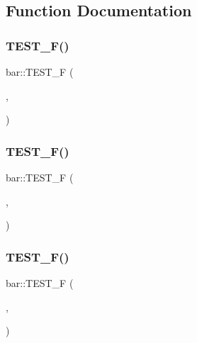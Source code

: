 \subsection{Function Documentation}
\mbox{\label{namespacebar_a95397ed83e5072747d6333cbfae5ea0e}} 
\subsubsection{\texorpdfstring{TEST\_F()}{TEST\_F()}\hspace{0.1cm}{\footnotesize\ttfamily [1/6]}}
{\footnotesize\ttfamily bar\+::\+T\+E\+S\+T\+\_\+F (\begin{DoxyParamCaption}\item[{\mbox{\hyperlink{classbar_1_1_mixed_up_test_suite_test}{Mixed\+Up\+Test\+Suite\+Test}}}]{,  }\item[{This\+Should\+Fail}]{ }\end{DoxyParamCaption})}

\mbox{\label{namespacebar_ae02a29b454cf88337a77336c2bf1f0a4}} 
\subsubsection{\texorpdfstring{TEST\_F()}{TEST\_F()}\hspace{0.1cm}{\footnotesize\ttfamily [2/6]}}
{\footnotesize\ttfamily bar\+::\+T\+E\+S\+T\+\_\+F (\begin{DoxyParamCaption}\item[{\mbox{\hyperlink{classbar_1_1_mixed_up_test_suite_test}{Mixed\+Up\+Test\+Suite\+Test}}}]{,  }\item[{This\+Should\+Fail\+Too}]{ }\end{DoxyParamCaption})}

\mbox{\label{namespacebar_a0e342ef00f400f593f866279689c55ac}} 
\subsubsection{\texorpdfstring{TEST\_F()}{TEST\_F()}\hspace{0.1cm}{\footnotesize\ttfamily [3/6]}}
{\footnotesize\ttfamily bar\+::\+T\+E\+S\+T\+\_\+F (\begin{DoxyParamCaption}\item[{\mbox{\hyperlink{classbar_1_1_mixed_up_test_case_test}{Mixed\+Up\+Test\+Case\+Test}}}]{,  }\item[{This\+Should\+Fail}]{ }\end{DoxyParamCaption})}

